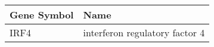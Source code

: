 \begin{tabular}{ll}
\toprule
Gene Symbol &                           Name \\
\midrule
       IRF4 & interferon regulatory factor 4 \\
\bottomrule
\end{tabular}
